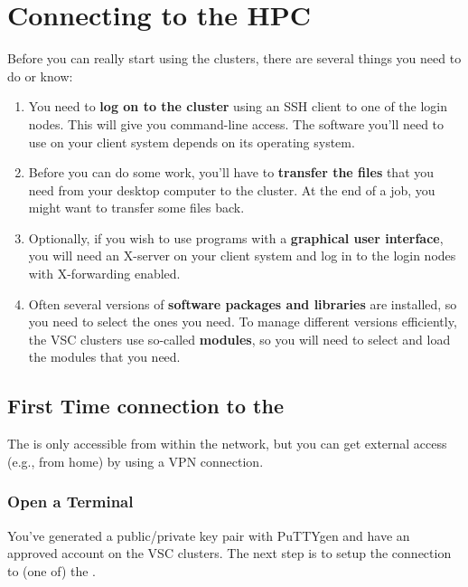 \chapter{Connecting to the HPC}
\label{ch:preparing-the-environment}

Before you can really start using the \hpc clusters, there are several things you need to do or know:

\begin{enumerate}
\item  You need to \textbf{log on to the cluster} using an SSH client to one of the login nodes. This will give you command-line access. The software you'll need to use on your client system depends on its operating system.
\item  Before you can do some work, you'll have to \textbf{transfer the files} that you need from your desktop computer to the cluster. At the end of a job, you might want to transfer some files back.
\item  Optionally, if you wish to use programs with a \textbf{graphical user interface}, you will need an X-server on your client system and log in to the login nodes with X-forwarding enabled.
\item  Often several versions of \textbf{software packages and libraries} are installed, so you need to select the ones you need. To manage different versions efficiently, the VSC clusters use so-called \textbf{modules}, so you will need to select and load the modules that you need.
\end{enumerate}

\section{First Time connection to the \hpc}
\label{sec:first-time-connection-to-the-hpc}

\ifantwerpen
 The \hpc is only accessible from within the \university network, but you can
 get external access (e.g., from home) by using a VPN connection.
\fi

\ifwindows

  \subsection{Open a Terminal}
  \label{sec:windows-open-a-terminal}

  You've generated a public/private key pair with PuTTYgen and have an approved
  account on the VSC clusters.  The next step is to setup the connection to (one
  of) the \hpc.

